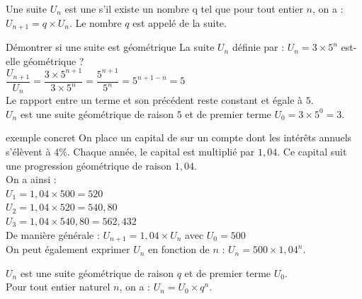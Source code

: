 \begin{bdefi}
	Une suite $U_n$ est une  s'il existe un nombre q tel que pour tout entier $n$, on a : $U_{n+1}=q\times U_n$.
	Le nombre $q$ est appelé  de la suite.
\end{bdefi}

\begin{bmethodet}{Démontrer si une suite est géométrique}
	La suite $U_n$ définie par : $U_n=3\times 5^n$  est-elle géométrique ?
	\ \\
	$\dfrac{U_{n+1}}{U_n} =\dfrac{3\times 5^{n+1}}{3\times 5^n}=\dfrac{5^{n+1}}{5^n} =5^{n+1-n}=5$\\
	Le rapport entre un terme et son précédent reste constant et égale à $5$.\\
	$U_n$ est une suite géométrique de raison $5$ et de premier terme $U_0=3\times 5^0=3$.
\end{bmethodet}

\begin{bexemplet}{exemple concret}
	On place un capital de  sur un compte dont les intérêts annuels s'élèvent à $4\%$.
	Chaque année, le capital est multiplié par $1,04$.
	Ce capital suit une progression géométrique de raison $1,04$.\\
	
	On a ainsi :\\ 
	$U_1=1,04\times 500=520$\\		
	$U_2=1,04\times 520=540,80$\\
	$U_3=1,04\times 540,80=562,432$\\	
	De manière générale : $U_{n+1}=1,04\times U_n$ avec $U_0=500$\\ 
	On peut également exprimer $U_n$ en fonction de $n$ : $U_n= 500\times1,04^n$. 
\end{bexemplet}

\begin{propriete}
	$U_n$ est une suite géométrique de raison $q$ et de premier terme $U_0$.\\
	Pour tout entier naturel $n$, on a : $U_n= U_0\times q^n$.
\end{propriete}

